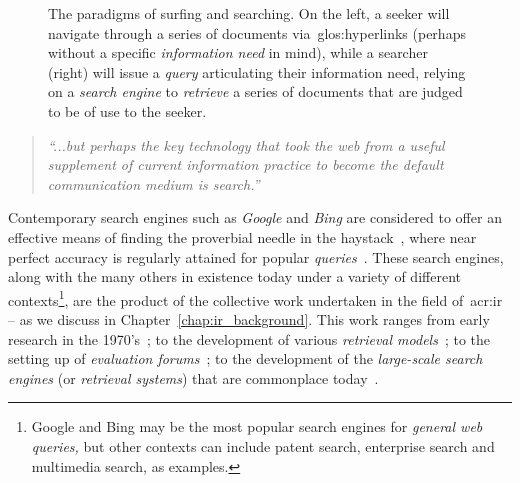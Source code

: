 \begin{figure}[t!]
    \centering
    \caption[Surfing vs. Searching]{The paradigms of surfing and searching. On the left, a seeker will navigate through a series of documents via~\glspl{glos:hyperlink} (perhaps without a specific \emph{information need} in mind), while a searcher (right) will issue a \emph{query} articulating their information need, relying on a \emph{search engine} to \emph{retrieve} a series of documents that are judged to be of use to the seeker.}
    \label{fig:ch1-surfing}
\end{figure}

\begin{quote}
    \emph{``...but perhaps the key technology that took the web from a useful supplement of current information practice to become the default communication medium is search.''}
\end{quote}

Contemporary search engines such as \emph{Google} and \emph{Bing} are considered to offer an effective means of finding the proverbial needle in the haystack~\citep{wilson2010keyword_search}, where near perfect accuracy is regularly attained for popular \emph{queries}~\citep{vaughan2004new_measurements}. These search engines, along with the many others in existence today under a variety of different contexts\footnote{Google and Bing may be the most popular search engines for \emph{general web queries,} but other contexts can include patent search, enterprise search and multimedia search, as examples.}, are the product of the collective work undertaken in the field of~\gls{acr:ir} -- as we discuss in Chapter~\ref{chap:ir_background}. This work ranges from early research in the 1970's~\citep{cleverdon1962cranfield_experiments,rijsbergen1979ir}; to the development of various \emph{retrieval models}~\citep{robertson2009probabilistic_models}; to the setting up of \emph{evaluation forums}~\citep{harman1993trec1}; to the development of the \emph{large-scale search engines} (or \emph{retrieval systems}) that are commonplace today~\citep{baezayates1999modern_ir, wang2010language_models}.

